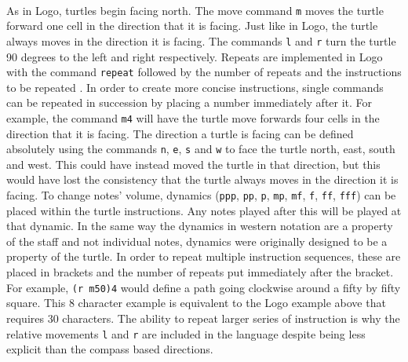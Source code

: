 \paragraph{} As in Logo, turtles begin facing north. The move command \texttt{m} moves the turtle forward one cell in the direction that it is facing. Just like in Logo, the turtle always moves in the direction it is facing. The commands \texttt{l} and \texttt{r} turn the turtle 90 degrees to the left and right respectively. Repeats are implemented in Logo with the command \texttt{repeat} followed by the number of repeats and the instructions to be repeated \cite{goldman:turtle}. In order to create more concise instructions, single commands can be repeated in succession by placing a number immediately after it. For example, the command \texttt{m4} will have the turtle move forwards four cells in the direction that it is facing. The direction a turtle is facing can be defined absolutely using the commands \texttt{n}, \texttt{e}, \texttt{s} and \texttt{w} to face the turtle north, east, south and west. This could have instead moved the turtle in that direction, but this would have lost the consistency that the turtle always moves in the direction it is facing. To change notes' volume, dynamics (\texttt{ppp}, \texttt{pp}, \texttt{p}, \texttt{mp}, \texttt{mf}, \texttt{f}, \texttt{ff}, \texttt{fff}) can be placed within the turtle instructions. Any notes played after this will be played at that dynamic. In the same way the dynamics in western notation are a property of the staff and not individual notes, dynamics were originally designed to be a property of the turtle. In order to repeat multiple instruction sequences, these are placed in brackets and the number of repeats put immediately after the bracket. For example, \texttt{(r m50)4} would define a path going clockwise around a fifty by fifty square. This 8 character example is equivalent to the Logo example above that requires 30 characters. The ability to repeat larger series of instruction is why the relative movements \texttt{l} and \texttt{r} are included in the language despite being less explicit than the compass based directions.

